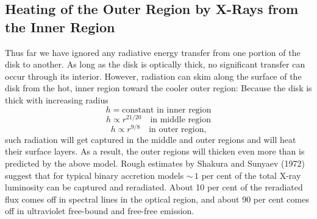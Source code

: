 \subsection{Heating of the Outer Region by X-Rays from the Inner Region}
\label{sec:5.11}

Thus far we have ignored any radiative energy transfer from one portion of the
disk to another.  As long as the disk is optically thick, no significant transfer can
occur through its interior.  However, radiation can skim along the surface of the
disk from the hot, inner region toward the cooler outer region:  Because the disk
is thick with increasing radius
%
\[
h = \text{constant in inner region}
\]
\[
h \propto r^{21/20} \quad \text{in middle region}
\]
\[
h \propto r^{9/8} \quad \text{in outer region,}
\]
%
such radiation will get captured in the middle and outer regions and will heat
their surface layers.  As a result, the outer regions will thicken even more than is
predicted by the above model.  Rough estimates by Shakura and Sunyaev (1972)
suggest that for typical binary accretion models ${\sim}\,1$ per cent of the total X-ray
luminosity can be captured and reradiated.  About 10 per cent of the reradiated
flux comes off in spectral lines in the optical region, and about 90 per cent comes
off in ultraviolet free-bound and free-free emission.
